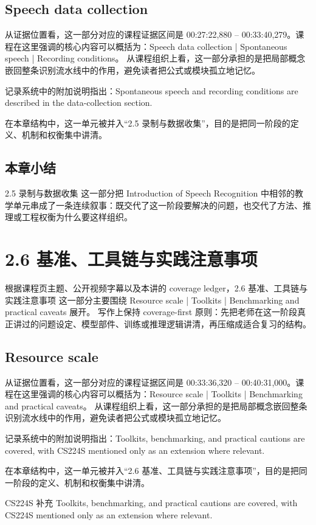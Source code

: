 \documentclass[a4paper]{article}
\begin{document}
\subsection{Speech data collection}
从证据位置看，这一部分对应的课程证据区间是 00:27:22,880 -- 00:33:40,279。课程在这里强调的核心内容可以概括为：Speech data collection | Spontaneous speech | Recording conditions。
从课程组织上看，这一部分承担的是把局部概念嵌回整条识别流水线中的作用，避免读者把公式或模块孤立地记忆。

记录系统中的附加说明指出：Spontaneous speech and recording conditions are described in the data-collection section.

在本章结构中，这一单元被并入“2.5 录制与数据收集”，目的是把同一阶段的定义、机制和权衡集中讲清。

\subsection{本章小结}
2.5 录制与数据收集 这一部分把 Introduction of Speech Recognition 中相邻的教学单元串成了一条连续叙事：既交代了这一阶段要解决的问题，也交代了方法、推理或工程权衡为什么要这样组织。

\section{2.6 基准、工具链与实践注意事项}
根据课程页主题、公开视频字幕以及本讲的 coverage ledger，2.6 基准、工具链与实践注意事项 这一部分主要围绕 Resource scale | Toolkits | Benchmarking and practical caveats 展开。
写作上保持 coverage-first 原则：先把老师在这一阶段真正讲过的问题设定、模型部件、训练或推理逻辑讲清，再压缩成适合复习的结构。

\subsection{Resource scale}
从证据位置看，这一部分对应的课程证据区间是 00:33:36,320 -- 00:40:31,000。课程在这里强调的核心内容可以概括为：Resource scale | Toolkits | Benchmarking and practical caveats。
从课程组织上看，这一部分承担的是把局部概念嵌回整条识别流水线中的作用，避免读者把公式或模块孤立地记忆。

记录系统中的附加说明指出：Toolkits, benchmarking, and practical cautions are covered, with CS224S mentioned only as an extension where relevant.

在本章结构中，这一单元被并入“2.6 基准、工具链与实践注意事项”，目的是把同一阶段的定义、机制和权衡集中讲清。
\begin{knowledgebox}{CS224S 补充}
Toolkits, benchmarking, and practical cautions are covered, with CS224S mentioned only as an extension where relevant.
\end{knowledgebox}
\end{document}
